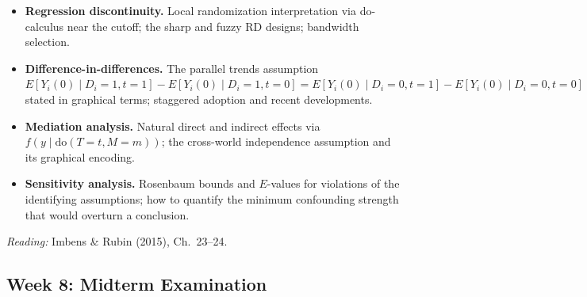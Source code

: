 \documentclass[12pt]{article}
\begin{document}
\begin{itemize}
  \item \textbf{Regression discontinuity.}
    Local randomization interpretation via do-calculus near the cutoff;
    the sharp and fuzzy RD designs; bandwidth selection.

  \item \textbf{Difference-in-differences.}
    The parallel trends assumption
    $E[Y_i(0) \mid D_i{=}1, t{=}1] - E[Y_i(0) \mid D_i{=}1, t{=}0]
     = E[Y_i(0) \mid D_i{=}0, t{=}1] - E[Y_i(0) \mid D_i{=}0, t{=}0]$
    stated in graphical terms; staggered adoption and recent developments.

  \item \textbf{Mediation analysis.}
    Natural direct and indirect effects via
    $f(y \mid \mathrm{do}(T{=}t, M{=}m))$;
    the cross-world independence assumption and its graphical encoding.

  \item \textbf{Sensitivity analysis.}
    Rosenbaum bounds and $E$-values for violations of the identifying
    assumptions; how to quantify the minimum confounding strength that
    would overturn a conclusion.
\end{itemize}

\noindent\textit{Reading:} Imbens \& Rubin (2015), Ch.~23--24.

\subsection*{Week 8: Midterm Examination}
\end{document}
